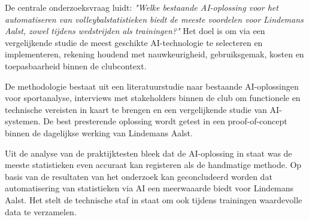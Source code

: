 De centrale onderzoeksvraag luidt: \textit{"Welke bestaande AI-oplossing voor het automatiseren van volleybalstatistieken biedt de meeste voordelen voor Lindemans Aalst, zowel tijdens wedstrijden als trainingen?"} Het doel is om via een vergelijkende studie de meest geschikte AI-technologie te selecteren en implementeren, rekening houdend met nauwkeurigheid, gebruiksgemak, kosten en toepasbaarheid binnen de clubcontext.

De methodologie bestaat uit een literatuurstudie naar bestaande AI-oplossingen voor sportanalyse, interviews met stakeholders binnen de club om functionele en technische vereisten in kaart te brengen en een vergelijkende studie van AI-systemen. De best presterende oplossing wordt getest in een proof-of-concept binnen de dagelijkse werking van Lindemans Aalst.

Uit de analyse van de praktijktesten bleek dat de AI-oplossing in staat was de meeste statistieken even accuraat kan registeren als de handmatige methode. Op basis van de resultaten van het onderzoek kan geconcludeerd worden dat automatisering van statistieken via AI een meerwaaarde biedt voor Lindemans Aalst. Het stelt de technische staf in staat om ook tijdens trainingen waardevolle data te verzamelen. 
